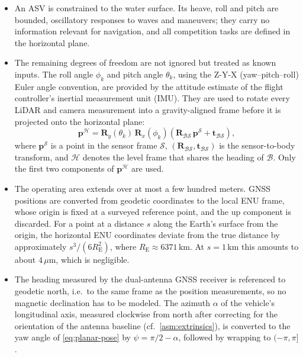 \begin{itemize}
  \item An ASV is constrained to the water surface. Its heave, roll and
  pitch are bounded, oscillatory responses to waves and maneuvers; they
  carry no information relevant for navigation, and all competition tasks
  are defined in the horizontal plane.

  \item The remaining degrees of freedom are not ignored but treated as
  known inputs. The roll angle $\phi_k$ and pitch angle $\theta_k$, using
  the Z-Y-X (yaw--pitch--roll) Euler angle convention, are provided by the
  attitude estimate of the flight controller's inertial measurement unit
  (IMU). They are used to rotate every LiDAR and camera measurement into a
  gravity-aligned frame before it is projected onto the horizontal plane:
  \begin{equation}
    \mathbf{p}^{\mathcal{H}} =
    \mathbf{R}_y(\theta_k)\,\mathbf{R}_x(\phi_k)
    \left( \mathbf{R}_{\mathcal{B}\mathcal{S}}\,\mathbf{p}^{\mathcal{S}}
         + \mathbf{t}_{\mathcal{B}\mathcal{S}} \right),
    \label{eq:tilt-compensation}
  \end{equation}
  where $\mathbf{p}^{\mathcal{S}}$ is a point in the sensor frame
  $\mathcal{S}$,
  $(\mathbf{R}_{\mathcal{B}\mathcal{S}}, \mathbf{t}_{\mathcal{B}\mathcal{S}})$
  is the sensor-to-body transform, and $\mathcal{H}$ denotes the level frame
  that shares the heading of $\mathcal{B}$. Only the first two components
  of $\mathbf{p}^{\mathcal{H}}$ are used.

  \item The operating area extends over at most a few hundred meters. GNSS
  positions are converted from geodetic coordinates to the local ENU frame,
  whose origin is fixed at a surveyed reference point, and the up component
  is discarded. For a point at a distance $s$ along the Earth's surface from
  the origin, the horizontal ENU coordinates deviate from the true distance
  by approximately $s^3 / (6 R_\mathrm{E}^2)$, where
  $R_\mathrm{E} \approx 6371\,\mathrm{km}$. At $s = 1\,\mathrm{km}$ this
  amounts to about $4\,\mu\mathrm{m}$, which is negligible.

  \item The heading measured by the dual-antenna GNSS receiver is referenced
  to geodetic north, i.e.\ to the same frame as the position measurements,
  so no magnetic declination has to be modeled. The azimuth $\alpha$ of the
  vehicle's longitudinal axis, measured clockwise from north after
  correcting for the orientation of the antenna baseline
  (cf.~\ref{asm:extrinsics}), is converted to the yaw angle of
  \eqref{eq:planar-pose} by $\psi = \pi/2 - \alpha$, followed by wrapping
  to $(-\pi, \pi]$.
\end{itemize}

